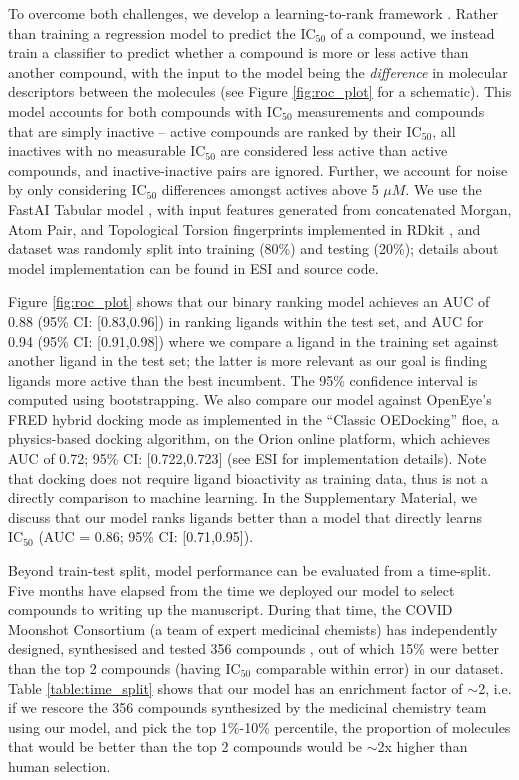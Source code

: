 To overcome both challenges, we develop a learning-to-rank framework \cite{duffy2010molecular,agarwal2010ranking}. Rather than training a regression model to predict the $\mathrm{IC}_{50}$ of a compound, we instead train a classifier to predict whether a compound is more or less active than another compound, with the input to the model being the \emph{difference} in molecular descriptors between the molecules (see Figure \ref{fig:roc_plot} for a schematic). This model accounts for both compounds with $\mathrm{IC}_{50}$ measurements and compounds that are simply inactive -- active compounds are ranked by their $\mathrm{IC}_{50}$, all inactives with no measurable $\mathrm{IC}_{50}$ are considered less active than active compounds, and inactive-inactive pairs are ignored. Further, we account for noise by only considering $\mathrm{IC}_{50}$ differences amongst actives above 5 $\mu M$. We use the FastAI Tabular model \cite{howard2018fastai}, with input features generated from concatenated Morgan, Atom Pair, and Topological Torsion fingerprints implemented in RDkit \cite{rdkit}, and dataset was randomly split into training (80\%) and testing (20\%); details about model implementation can be found in ESI and source code.


Figure \ref{fig:roc_plot} shows that our binary ranking model achieves an AUC of 0.88 (95\% CI: [0.83,0.96]) in ranking ligands within the test set, and AUC for 0.94 (95\% CI: [0.91,0.98]) where we compare a ligand in the training set against another ligand in the test set; the latter is more relevant as our goal is finding ligands more active than the best incumbent. The 95\% confidence interval is computed using bootstrapping. We also compare our model against OpenEye’s FRED hybrid docking mode as implemented in the ``Classic OEDocking'' floe, a physics-based docking algorithm, on the Orion online platform, which achieves AUC of 0.72; 95\% CI: [0.722,0.723] (see ESI for implementation details). Note that docking does not require ligand bioactivity as training data, thus is not a directly comparison to machine learning. In the Supplementary Material, we discuss that our model ranks ligands better than a model that directly learns $\mathrm{IC}_{50}$ (AUC = 0.86; 95\% CI: [0.71,0.95]). 

Beyond train-test split, model performance can be evaluated from a time-split. Five months have elapsed from the time we deployed our model to select compounds to writing up the manuscript. During that time, the COVID Moonshot Consortium (a team of expert medicinal chemists) has independently designed, synthesised and tested 356 compounds \cite{moonshot2020covid}, out of which 15\% were better than the top 2 compounds (having $\mathrm{IC}_{50}$ comparable within error) in our dataset. Table \ref{table:time_split} shows that our model has an enrichment factor of $\sim$2, i.e. if we rescore the 356 compounds synthesized by the medicinal chemistry team using our model, and pick the top 1\%-10\% percentile, the proportion of molecules that would be better than the top 2 compounds would be $\sim$2x higher than human selection. 

